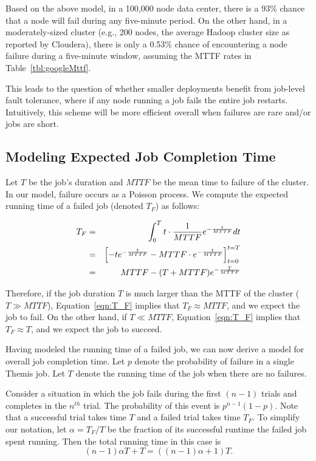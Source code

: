 Based on the above model, in a 100,000 node data center, there is a 93\% chance
that a node will fail during any five-minute period. On the other hand, in a
moderately-sized cluster (e.g., 200 nodes, the average Hadoop cluster size as
reported by Cloudera), there is only a 0.53\% chance of encountering a node
failure during a five-minute window, assuming the MTTF rates in
Table~\ref{tbl:googleMttf}.

This leads to the question of whether smaller deployments benefit from
job-level fault tolerance, where if any node running a job fails the entire job
restarts.  Intuitively, this scheme will be more efficient overall when
failures are rare and/or jobs are short.

\subsection{Modeling Expected Job Completion Time}

Let $T$ be the job's duration and $MTTF$ be the mean time to failure of the
cluster. In our model, failure occurs as a Poisson process. We compute the
expected running time of a failed job (denoted $T_F$) as follows:

\vspace{-4mm}

\begin{eqnarray}
T_{F} &=& \int_{0}^{T} t \cdot \frac{1}{MTTF} e^{-\frac{t}{MTTF}} dt \notag \\
      &=& \left[- t e^{-\frac{t}{MTTF}} - MTTF \cdot e^{-\frac{t}{MTTF}}\right]_{t = 0}^{t = T} \notag \\
      &=& MTTF - (T + MTTF) e^{-\frac{T}{MTTF}}
\label{eqn:T_F}
\end{eqnarray}

Therefore, if the job duration $T$ is much larger than the MTTF of the cluster
($T \gg MTTF$), Equation~\ref{eqn:T_F} implies that $T_F \approx MTTF$, and we
expect the job to fail. On the other hand, if $T \ll MTTF$,
Equation~\ref{eqn:T_F} implies that $T_F \approx T$, and we expect the job to
succeed.

Having modeled the running time of a failed job, we can now derive a model for
overall job completion time. Let $p$ denote the probability of failure in a
single Themis job.  Let $T$ denote the running time of the job when there are
no failures.

Consider a situation in which the job fails during the first $(n-1)$ trials and
completes in the $n^{th}$ trial. The probability of this event is $p^{n-1} (1 -
p)$.  Note that a successful trial takes time $T$ and a failed trial takes time
$T_F$.  To simplify our notation, let $\alpha = T_F / T$ be the fraction of its
successful runtime the failed job spent running.  Then the total running time
in this case is
\[(n-1) \alpha T + T = ((n-1) \alpha + 1) T.\]

